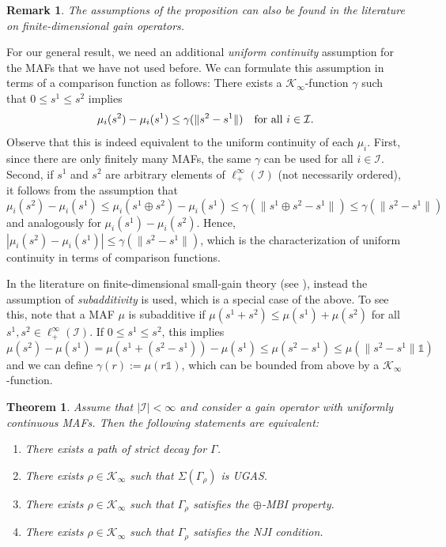 \documentclass[10pt, oneside, a4paper]{article}
\newcommand{\unit}{\mathds{1}}
\newcommand{\IC}{\mathcal{I}}
\newcommand{\KC}{\mathcal{K}}
\newtheorem{theorem}{Theorem}[section]
\newtheorem{remark}{Remark}[section]
\begin{document}
\begin{remark}
The assumptions of the proposition can also be found in the literature on finite-dimensional gain operators.
\end{remark}

For our general result, we need an additional \emph{uniform continuity} assumption for the MAFs that we have not used before. We can formulate this assumption in terms of a comparison function as follows: There exists a $\KC_{\infty}$-function $\gamma$ such that $0 \leq s^1 \leq s^2$ implies%
\begin{equation}\label{eq_mafs_uniform_cont}
  \mu_i(s^2) - \mu_i(s^1) \leq \gamma(\|s^2 - s^1\|) \mbox{\quad for all\ } i \in \IC.
\end{equation}
Observe that this is indeed equivalent to the uniform continuity of each $\mu_i$. First, since there are only finitely many MAFs, the same $\gamma$ can be used for all $i \in \IC$. Second, if $s^1$ and $s^2$ are arbitrary elements of $\ell^{\infty}_+(\IC)$ (not necessarily ordered), it follows from the assumption that%
\begin{equation*}
  \mu_i(s^2) - \mu_i(s^1) \leq \mu_i(s^1 \oplus s^2) - \mu_i(s^1) \leq \gamma(\|s^1 \oplus s^2 - s^1\|) \leq \gamma(\|s^2 - s^1\|)%
\end{equation*}
and analogously for $\mu_i(s^1) - \mu_i(s^2)$. Hence, $|\mu_i(s^2) - \mu_i(s^1)| \leq \gamma(\|s^2 - s^1\|)$, which is the characterization of uniform continuity in terms of comparison functions.%

In the literature on finite-dimensional small-gain theory (see \cite{DR1,DR2,Ruf}), instead the assumption of \emph{subadditivity} is used, which is a special case of the above. To see this, note that a MAF $\mu$ is subadditive if $\mu(s^1 + s^2) \leq \mu(s^1) + \mu(s^2)$ for all $s^1,s^2 \in \ell^{\infty}_+(\IC)$. If $0 \leq s^1 \leq s^2$, this implies%
\begin{equation*}
  \mu(s^2) - \mu(s^1) = \mu(s^1 + (s^2 - s^1)) - \mu(s^1) \leq \mu(s^2 - s^1) \leq \mu( \|s^2 - s^1\|\unit )%
\end{equation*}
and we can define $\gamma(r) := \mu(r\unit)$, which can be bounded from above by a $\KC_{\infty}$-function.%

\begin{theorem}\label{thm_finite_general_case}
Assume that $|\IC| < \infty$ and consider a gain operator with uniformly continuous MAFs. Then the following statements are equivalent:%
\begin{enumerate}
\item[(a)] There exists a path of strict decay for $\Gamma$.%
\item[(b)] There exists $\rho \in \KC_{\infty}$ such that $\Sigma(\Gamma_{\rho})$ is UGAS.
\item[(c)] There exists $\rho \in \KC_{\infty}$ such that $\Gamma_{\rho}$ satisfies the $\oplus$-MBI property.%
\item[(d)] There exists $\rho \in \KC_{\infty}$ such that $\Gamma_{\rho}$ satisfies the NJI condition.%
\end{enumerate}
\end{theorem}
\end{document}
